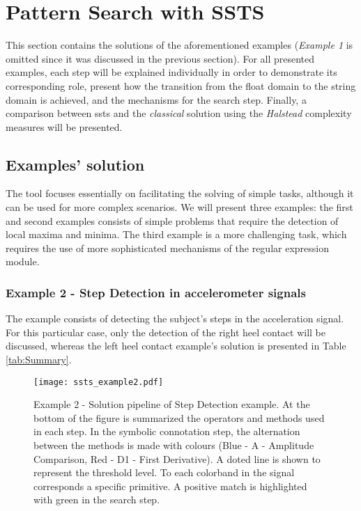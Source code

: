 \section{Pattern Search with SSTS}

This section contains the solutions of the aforementioned examples (\textit{Example 1} is omitted since it was discussed in the previous section). For all presented examples, each step will be explained individually in order to demonstrate its corresponding role, present how the transition from the float domain to the string domain is achieved, and the mechanisms for the search step. Finally, a comparison between \gls{ssts} and the \textit{classical} solution using the \textit{Halstead} complexity measures will be presented.

\subsection{Examples' solution}
The tool focuses essentially on facilitating the solving of simple tasks, although it can be used for more complex scenarios. We will present three examples: the first and second examples consists of simple problems that require the detection of local maxima and minima. The third example is a more challenging task, which requires the use of more sophisticated mechanisms of the regular expression module.

\subsubsection{Example 2 - Step Detection in accelerometer signals}

The example consists of detecting the subject's steps in the acceleration signal. For this particular case, only the detection of the right heel contact will be discussed, whereas the left heel contact example's solution is presented in Table \ref{tab:Summary}.

\begin{figure}[H]
  \centering
      \texttt{[image: ssts\_example2.pdf]}
  \caption{Example 2 - Solution pipeline of Step Detection example. At the bottom of the figure is summarized the operators and methods used in each step. In the symbolic connotation step, the alternation between the methods is made with colours (Blue - A - Amplitude Comparison, Red - D1 - First Derivative). A doted line is shown to represent the threshold level. To each colorband in the signal corresponds a specific primitive. A positive match is highlighted with green in the search step.}
  \label{fig:Exercise2}
\end{figure}

